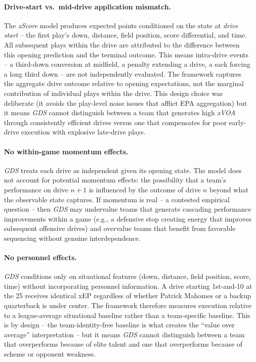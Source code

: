 \documentclass[12pt,a4paper]{article}
\newcommand{\xscore}{\textit{xScore}}
\newcommand{\xvoa}{\textit{xVOA}}
\newcommand{\gds}{\textit{GDS}}
\begin{document}
\paragraph{Drive-start vs.\ mid-drive application mismatch.}
The \xscore{} model produces expected points conditioned on the state at \emph{drive start} -- the first play's down, distance, field position, score differential, and time. All subsequent plays within the drive are attributed to the difference between this opening prediction and the terminal outcome. This means intra-drive events -- a third-down conversion at midfield, a penalty extending a drive, a sack forcing a long third down -- are not independently evaluated. The framework captures the aggregate drive outcome relative to opening expectations, not the marginal contribution of individual plays within the drive. This design choice was deliberate (it avoids the play-level noise issues that afflict EPA aggregation) but it means \gds{} cannot distinguish between a team that generates high \xvoa{} through consistently efficient drives versus one that compensates for poor early-drive execution with explosive late-drive plays.

\paragraph{No within-game momentum effects.}
\gds{} treats each drive as independent given its opening state. The model does not account for potential momentum effects: the possibility that a team's performance on drive $n+1$ is influenced by the outcome of drive $n$ beyond what the observable state captures. If momentum is real -- a contested empirical question \citep{vergin2000winning} -- then \gds{} may undervalue teams that generate cascading performance improvements within a game (e.g., a defensive stop creating energy that improves subsequent offensive drives) and overvalue teams that benefit from favorable sequencing without genuine interdependence.

\paragraph{No personnel effects.}
\gds{} conditions only on situational features (down, distance, field position, score, time) without incorporating personnel information. A drive starting 1st-and-10 at the 25 receives identical xEP regardless of whether Patrick Mahomes or a backup quarterback is under center. The framework therefore measures execution relative to a league-average situational baseline rather than a team-specific baseline. This is by design -- the team-identity-free baseline is what creates the ``value over average'' interpretation -- but it means \gds{} cannot distinguish between a team that overperforms because of elite talent and one that overperforms because of scheme or opponent weakness.
\end{document}
